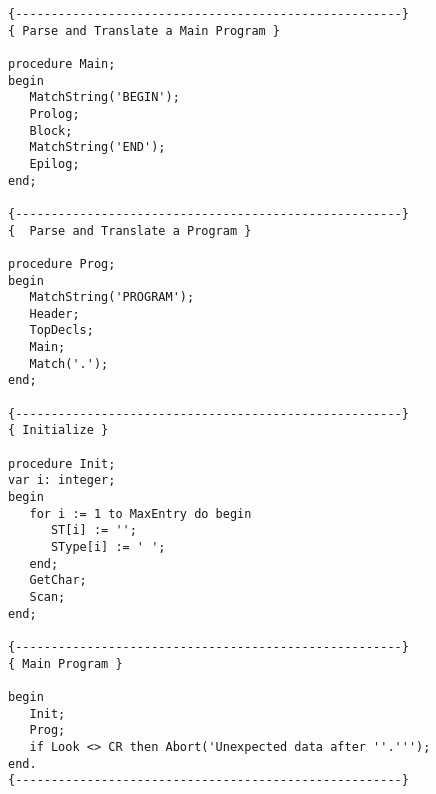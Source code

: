 \begin{verbatim}
{------------------------------------------------------}
{ Parse and Translate a Main Program }

procedure Main;
begin
   MatchString('BEGIN');
   Prolog;
   Block;
   MatchString('END');
   Epilog;
end;

{------------------------------------------------------}
{  Parse and Translate a Program }

procedure Prog;
begin
   MatchString('PROGRAM');
   Header;
   TopDecls;
   Main;
   Match('.');
end;

{------------------------------------------------------}
{ Initialize }

procedure Init;
var i: integer;
begin
   for i := 1 to MaxEntry do begin
      ST[i] := '';
      SType[i] := ' ';
   end;
   GetChar;
   Scan;
end;

{------------------------------------------------------}
{ Main Program }

begin
   Init;
   Prog;
   if Look <> CR then Abort('Unexpected data after ''.''');
end.
{------------------------------------------------------}
\end{verbatim}
